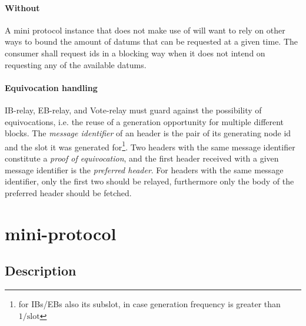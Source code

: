 \paragraph{Without \BoundedWindow{}} A \relay{} mini protocol instance that does not make use of \BoundedWindow{} will want to rely on other ways to bound the amount of datums that can be requested at a given time.
The consumer shall request ids in a blocking way when it does not
intend on requesting any of the available datums.


\paragraph{Equivocation handling} IB-relay, EB-relay, and Vote-relay must guard against the possibility of equivocations, i.e. the reuse of a generation opportunity for multiple different blocks.
The \emph{message identifier} of an header is the pair of its
generating node id and the slot it was generated for\footnote{for IBs/EBs also its subslot, in
case generation frequency is greater than $1/\text{slot}$}. Two headers
with the same message identifier constitute a \emph{proof of
equivocation}, and the first header received with a given message
identifier is the \emph{preferred header}. For headers with the same
message identifier, only the first two should be relayed, furthermore
only the body of the preferred header should be fetched.

\section{\fetch{} mini-protocol}
\label{ptcl:fetch}

\renewcommand{\StIdle}{\state{StIdle}}
\renewcommand{\StBusy}{\state{StBusy}}
\newcommand{\StStreaming}{\state{StStreaming}}
\renewcommand{\StDone}{\state{StDone}}
\newcommand{\MsgRequestBodies}{\msg{MsgRequestBodies}}
\newcommand{\MsgStartBatch}{\msg{MsgStartBatch}}
\newcommand{\MsgNoBlocks}{\msg{MsgNoBlocks}}
\newcommand{\MsgBody}{\msg{MsgBody}}
\newcommand{\MsgBatchDone}{\msg{MsgBatchDone}}
\newcommand{\MsgConsumerDone}{\msg{MsgConsumerDone}}
\newcommand{\point}{\text{point}} \newcommand{\slot}{\text{slot}}
\newcommand{\body}{\text{body}} \newcommand{\request}{\text{request}}
\newcommand{\hash}{\text{hash}} \newcommand{\rbrange}{\text{range}}
\subsection{Description}

